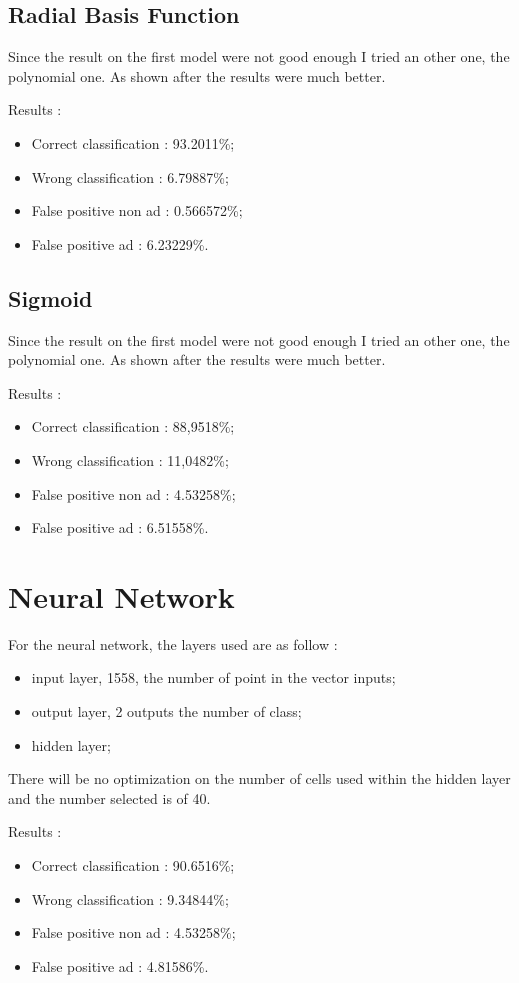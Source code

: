 \subsection{Radial Basis Function}

Since the result on the first model were not good enough I tried an other one, the polynomial one. As shown after the results were much better.

Results :
\begin{itemize}
  \item Correct classification : 93.2011\%;
  \item Wrong classification : 6.79887\%;
  \item False positive non ad : 0.566572\%;
  \item False positive ad : 6.23229\%.
\end{itemize}

\subsection{Sigmoid}

Since the result on the first model were not good enough I tried an other one, the polynomial one. As shown after the results were much better.

Results :
\begin{itemize}
  \item Correct classification : 88,9518\%;
  \item Wrong classification : 11,0482\%;
  \item False positive non ad : 4.53258\%;
  \item False positive ad : 6.51558\%.
\end{itemize}

\section{Neural Network}
For the neural network, the layers used are as follow :
  \begin{itemize}
    \item input layer, 1558, the number of point in the vector inputs;
    \item output layer, 2 outputs the number of class;
    \item hidden layer;
  \end{itemize}
  There will be no optimization on the number of cells used within the hidden layer and the number selected is of 40.

  Results :
  \begin{itemize}
    \item Correct classification : 90.6516\%;
    \item Wrong classification : 9.34844\%;
    \item False positive non ad : 4.53258\%;
    \item False positive ad : 4.81586\%.
  \end{itemize}


